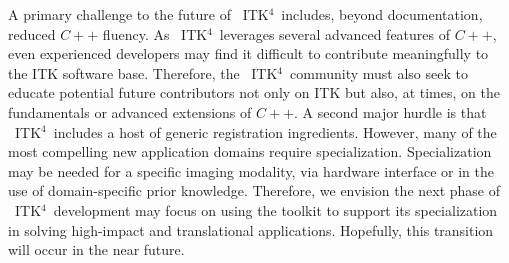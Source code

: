 \documentclass{frontiersSCNS}
\newcommand{\tk}{~ITK$^{\text{4}}$~}
\begin{document}
A primary challenge to the future of \tk includes, beyond
documentation, reduced $C++$ fluency.  As \tk leverages several
advanced features of $C++$, even experienced developers may find it
difficult to contribute meaningfully to the ITK software base.
Therefore, the \tk community must also seek to educate potential
future contributors not only on ITK but also, at times, on the
fundamentals or advanced extensions of $C++$.  A second major hurdle
is that \tk includes a host of generic registration ingredients.
However, many of the most compelling new application domains require
specialization.  Specialization may be needed for a specific imaging
modality, via hardware interface or in the use of
domain-specific prior knowledge.  Therefore, we envision the next
phase of \tk development may focus on using the toolkit to support its
specialization in solving high-impact and translational applications.
Hopefully, this transition will occur in the near future.



\end{document}
